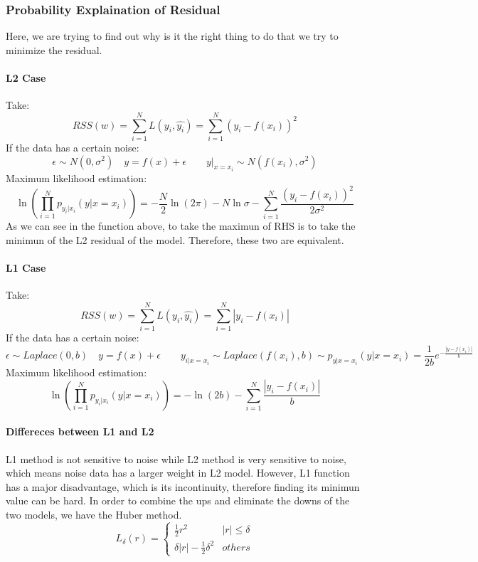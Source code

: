 \documentclass{article}
\begin{document}
	\subsubsection{Probability Explaination of Residual}
	Here, we are trying to find out why is it the right thing to do that we try to minimize the residual.
	\paragraph{L2 Case}
	Take:
	\begin{displaymath}
		RSS(w) = \sum_{i=1}^{N}L(y_i,\hat{y_i}) = \sum_{i=1}^{N}(y_i - f(x_i))^2
	\end{displaymath}
	If the data has a certain noise:
	\begin{displaymath}
		\epsilon \sim N(0,\sigma ^2) \quad y = f(x) + \epsilon \qquad y|_{x = x_i} \sim N(f(x_i), \sigma ^2)
	\end{displaymath}
	Maximum likelihood estimation:
	\begin{displaymath}
		\ln(\prod_{i=1}^{N}p_{y_i|x_i}(y|x=x_i) )
		= -\frac{N}{2}\ln(2\pi) - N\ln\sigma - \sum_{i=1}^{N}\frac{(y_i-f(x_i))^2}{2\sigma ^2}
	\end{displaymath}
	As we can see in the function above, to take the maximun of RHS is to take the minimun of the L2 residual of the model. Therefore, these two are equivalent.
	\paragraph{L1 Case}
	Take:
	\begin{displaymath}
	RSS(w) = \sum_{i=1}^{N}L(y_i,\hat{y_i}) = \sum_{i=1}^{N}|y_i - f(x_i)|
	\end{displaymath}
	If the data has a certain noise:
	\begin{displaymath}
	\epsilon \sim Laplace(0,b) \quad y = f(x) + \epsilon \qquad y_{i|x=x_i} \sim Laplace(f(x_i),b)
	\sim p_{y|x=x_i}(y|x=x_i) = \frac{1}{2b} e^{-\frac{|y-f(x_i)|}{b}}
	\end{displaymath}
	Maximum likelihood estimation:
	\begin{displaymath}
	\ln(\prod_{i=1}^{N}p_{y_i|x_i}(y|x=x_i))
	= -\ln(2b) - \sum_{i=1}^{N}\frac{|y_i-f(x_i)|}{b}
	\end{displaymath}
	\paragraph{Differeces between L1 and L2}
	L1 method is not sensitive to noise while L2 method is very sensitive to noise, which means noise data has a larger weight in L2 model. However, L1 function has a major disadvantage, which is its  incontinuity, therefore finding its minimun value can be hard. In order to combine the ups and eliminate the downs of the two models, we have the Huber method.
	\begin{displaymath}
	L_\delta(r) = \left\{ \begin{array}{ll}
	\frac{1}{2}r^2 & |r| \le \delta \\
	\delta |r| - \frac{1}{2}\delta ^2 & others
	\end{array} \right.
	\end{displaymath}
\end{document}
